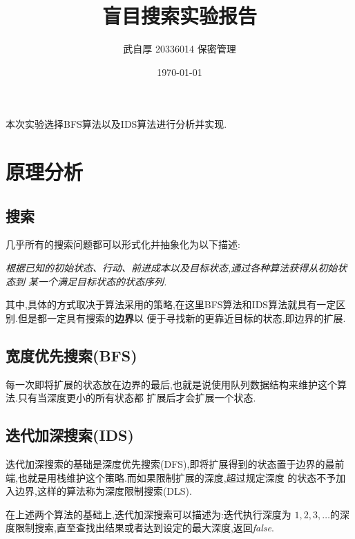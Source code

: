 
\geometry{a4paper}
\title{盲目搜索实验报告}
\author{武自厚 20336014 保密管理}
\date{\today}

\newcommand{\code}[1]{\texttt{#1}}
\newcommand{\true}[0]{\textbf{\emph{true}}}
\newcommand{\false}[0]{\textbf{\emph{false}}}
\newcommand{\img}[3]{\begin{figure}[H]
    \centering
    \texttt{[image: \#2]}
    \caption{#3}
\end{figure}}


    \maketitle
    本次实验选择BFS算法以及IDS算法进行分析并实现.

    \section{原理分析}

    \subsection{搜索}
    几乎所有的搜索问题都可以形式化并抽象化为以下描述:

    \emph{根据已知的初始状态、行动、前进成本以及目标状态,通过各种算法获得从初始状态到
    某一个满足目标状态的状态序列.}

    其中,具体的方式取决于算法采用的策略,在这里BFS算法和IDS算法就具有一定区别.但是都一定具有搜索的\textbf{边界}以
    便于寻找新的更靠近目标的状态,即边界的扩展.

    \subsection{宽度优先搜索(BFS)}
    每一次即将扩展的状态放在边界的最后,也就是说使用队列数据结构来维护这个算法.只有当深度更小的所有状态都
    扩展后才会扩展一个状态.
    \subsection{迭代加深搜索(IDS)}
    迭代加深搜索的基础是深度优先搜索(DFS),即将扩展得到的状态置于边界的最前端,也就是用栈维护这个策略.而如果限制扩展的深度,超过规定深度
    的状态不予加入边界,这样的算法称为深度限制搜索(DLS).
    
    在上述两个算法的基础上,迭代加深搜索可以描述为:迭代执行深度为
    \(1,2,3,\dots\)的深度限制搜索,直至查找出结果或者达到设定的最大深度,返回\emph{false}.

